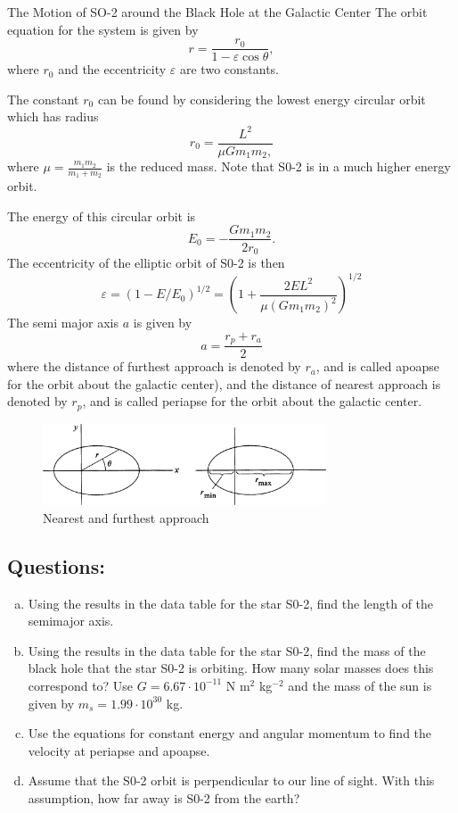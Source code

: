 \documentclass{esg8012pset}
\begin{document}
\begin{problem}{The Motion of SO-2 around the Black Hole at the Galactic Center}
    The orbit equation for the system is given by
    $$r = \frac{r_0}{1 - \varepsilon\cos\theta},$$
    where $r_0$ and the eccentricity $\varepsilon$ are two constants.

    The constant $r_0$ can be found by considering the lowest energy circular orbit which has radius
    $$r_0 = \frac{L^2}{\mu G m_1 m_2,}$$
    where $\mu = \frac{m_1 m_2}{m_1 + m_2}$ is the reduced mass. Note that S0-2 is in a much higher energy orbit.

    The energy of this circular orbit is
    $$E_0 = -\frac{G m_1 m_2}{2r_0}.$$
    The eccentricity of the elliptic orbit of S0-2 is then
    $$\varepsilon = (1 - E / E_0)^{1/2} = \left(1 + \frac{2 E L^2}{\mu(G m_1 m_2)^2}\right)^{1/2}$$
    The semi major axis $a$ is given by
    $$a = \frac{r_p + r_a}{2}$$
    where the distance of furthest approach is denoted by $r_a$, and is called apoapse for the orbit about the galactic center), and the distance of nearest approach is denoted by $r_p$, and is called periapse for the orbit about the galactic center.
    \begin{figure}[!h]
      \begin{center}\includegraphics[width=0.75\textwidth]{ps10_6}\end{center}
      \caption{Nearest and furthest approach}
    \end{figure}

  \subsection{Questions:}
    \begin{enumerate}[(a)]
      \item Using the results in the data table for the star S0-2, find the length of the semimajor axis.
      \item Using the results in the data table for the star S0-2, find the mass of the black hole that the star S0-2 is orbiting. How many solar masses does this correspond to?  Use $G = 6.67 \cdot 10^{-11}$ N m$^2$ kg$^{-2}$ and the mass of the sun is given by $m_s = 1.99 \cdot 10^{30}$ kg.
      \item Use the equations for constant energy and angular momentum to find the velocity at periapse and apoapse.
      \item Assume that the S0-2 orbit is perpendicular to our line of sight. With this assumption, how far away is S0-2 from the earth?
    \end{enumerate}
\end{problem}
\end{document}
